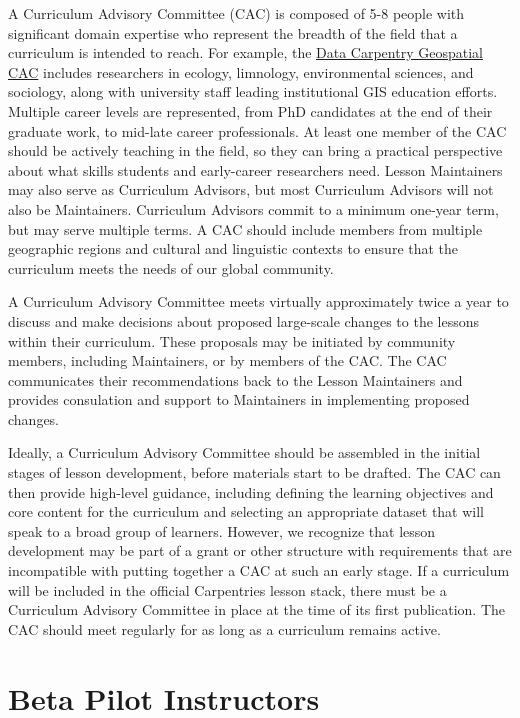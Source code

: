 \documentclass[
]{book}
\begin{document}
A Curriculum Advisory Committee (CAC)
is composed of 5-8 people with significant domain expertise who represent the
breadth of the field that a curriculum is intended to reach. For example, the
\href{https://datacarpentry.org/lesson-leadership/}{Data Carpentry Geospatial CAC}
includes researchers in ecology, limnology, environmental sciences, and sociology,
along with university staff leading institutional GIS education efforts. Multiple
career levels are represented, from PhD candidates at the end of their graduate
work, to mid-late career professionals. At least one member of the CAC should
be actively teaching in the field, so they can bring a practical perspective
about what skills students and early-career researchers need. Lesson Maintainers
may also serve as Curriculum Advisors, but most Curriculum Advisors will not
also be Maintainers. Curriculum Advisors commit to a minimum one-year term, but
may serve multiple terms. A CAC should include members from multiple geographic
regions and cultural and linguistic contexts to ensure that the curriculum
meets the needs of our global community.

A Curriculum Advisory Committee meets virtually approximately twice a year to
discuss and make decisions about proposed large-scale
changes to the lessons within their curriculum. These proposals may be initiated
by community members, including Maintainers, or by members of the CAC. The CAC
communicates their recommendations back to the Lesson Maintainers and provides
consulation and support to Maintainers in implementing proposed changes.

Ideally, a Curriculum Advisory Committee should be assembled in the initial
stages of lesson development, before materials start to be drafted. The CAC
can then provide high-level guidance, including defining the learning objectives
and core content for the curriculum and selecting an appropriate dataset that
will speak to a broad group of learners. However, we recognize that lesson
development may be part of a grant or other structure with requirements that are
incompatible with putting together a CAC at such an early stage. If a curriculum
will be included in the official Carpentries lesson stack, there
must be a Curriculum Advisory Committee in place at the time of
its first publication. The CAC should meet regularly for as long as a curriculum
remains active.

\hypertarget{beta-pilot-instructors}{%
\section{Beta Pilot Instructors}\label{beta-pilot-instructors}}
\end{document}
